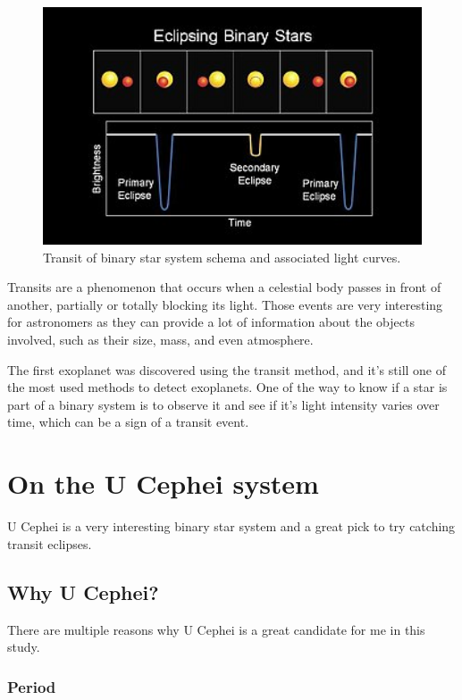 \documentclass[12pt,a4paper]{article}
\begin{document}
\begin{figure}[H]
    \centering
    \includegraphics[width=1\textwidth]{assets/star-transits.jpg}
    \caption{Transit of binary star system schema and associated light curves.}
    \label{fig:transits}
\end{figure}


Transits are a phenomenon that occurs when a celestial body passes in front of another, partially or totally blocking its light.
Those events are very interesting for astronomers as they can provide a lot of information about the objects involved, such as their size, mass, and even atmosphere.

The first exoplanet was discovered using the transit method, and it's still one of the most used methods to detect exoplanets.
One of the way to know if a star is part of a binary system is to observe it and see if it's light intensity varies over time, which can be a sign of a transit event.

\section{On the U Cephei system}

U Cephei is a very interesting binary star system and a great pick to try catching transit eclipses. 

\subsection{Why U Cephei?}

There are multiple reasons why U Cephei is a great candidate for me in this study.

\subsubsection{Period}
\end{document}
